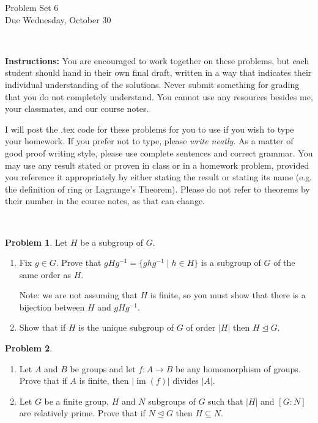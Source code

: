 \documentclass[11pt]{article}
\title{}
\date{\vspace{-0.5in}}
\def\norm{\mathrel{\unlhd}}
\def\norm{\mathrel{\unlhd}}
\theoremstyle{definition}
\newtheorem{problem}{Problem}
\begin{document}
\thispagestyle{fancy}
\pagestyle{fancy}

\vspace{3em}

\begin{center}
	{\LARGE Problem Set 6 \\}
	Due Wednesday, October 30
\end{center}

\

\noindent
{\bf Instructions:}
You are encouraged to work together on these problems, but each student should hand in their own final draft, written in a way that indicates their individual understanding of the solutions. Never submit something for grading that you do not completely understand. You cannot use any resources besides me, your classmates, and our course notes.


I will post the .tex code for these problems for you to use if you wish to type your homework. If you prefer not to type, please  {\em write neatly}. As a matter of good proof writing style, please use complete sentences and correct grammar. You may use any result  stated or proven in class or in a homework problem, provided you reference it appropriately by either stating the result or stating its name (e.g. the definition of ring or Lagrange's Theorem). Please do not refer to theorems by their number in the course notes, as that can change.


\




\begin{problem}
Let $H$ be a subgroup of $G$.
\begin{enumerate}[label=(1.\arabic*)]
\item Fix $g \in G$. Prove that $gHg^{-1}=\{ghg^{-1} \mid h\in H\}$ is a subgroup of $G$ of the same order as $H$.

\noindent
Note: we are not assuming that $H$ is finite, so you must show that there is a bijection between $H$ and $gHg^{-1}$.

\item Show that if $H$ is the unique subgroup of $G$ of order $|H|$ then $H \norm G$.
\end{enumerate}
\end{problem}




\begin{problem}$\,$
\begin{enumerate}[label=(2.\arabic*)]
\item Let $A$ and $B$ be groups and let $f\!: A \to B$ be any homomorphism of groups. Prove that if $A$ is finite, then $|\operatorname{im}(f)|$ divides $|A|$.


\item Let $G$ be a finite group, $H$ and $N$ subgroups of $G$ such that $|H|$ and $[G : N]$ are relatively prime. Prove that if $N \norm G$ then $H \subseteq N$.

\end{enumerate}
\end{problem}
\end{document}
